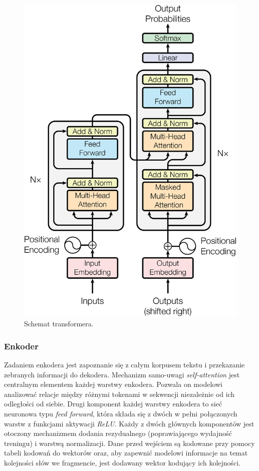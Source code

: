 \documentclass[data-science]{agh-wi} %
\begin{document}
\begin{figure}[!ht]
    \begin{center}
        \includegraphics[width=0.7\linewidth]{img/transformer1}
    \end{center}
    \caption{Schemat transformera.}
    \label{fig:transformer1}
\end{figure}

\subsubsection*{Enkoder}
Zadaniem enkodera jest zapoznanie się z całym korpusem tekstu i przekazanie zebranych informacji do dekodera. Mechanizm samo-uwagi \textit{self-attention} jest centralnym elementem każdej warstwy enkodera. Pozwala on modelowi analizować relacje między różnymi tokenami w sekwencji niezależnie od ich odległości od siebie. Drugi komponent każdej warstwy enkodera to sieć neuronowa typu \textit{feed forward}, która składa się z dwóch w pełni połączonych warstw z funkcjami aktywacji \textit{ReLU}. Każdy z dwóch głównych komponentów jest otoczony mechanizmem dodania rezydualnego (poprawiającego wydajność treningu) i warstwą normalizacji. Dane przed wejściem są kodowane przy pomocy tabeli kodowań do wektorów oraz, aby zapewnić modelowi informacje na temat kolejności słów we fragmencie, jest dodawany wektor kodujący ich kolejności.
\end{document}
